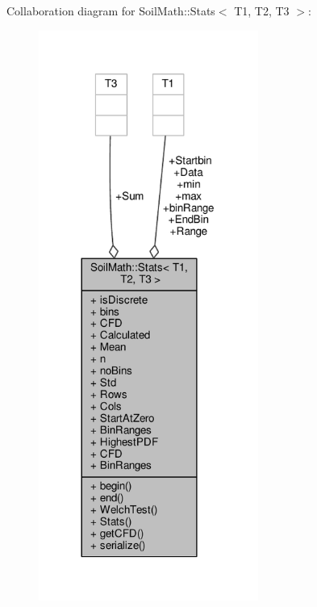 Collaboration diagram for Soil\+Math\+:\+:Stats$<$ T1, T2, T3 $>$\+:
\nopagebreak
\begin{figure}[H]
\begin{center}
\leavevmode
\includegraphics[width=204pt]{class_soil_math_1_1_stats__coll__graph}
\end{center}
\end{figure}
